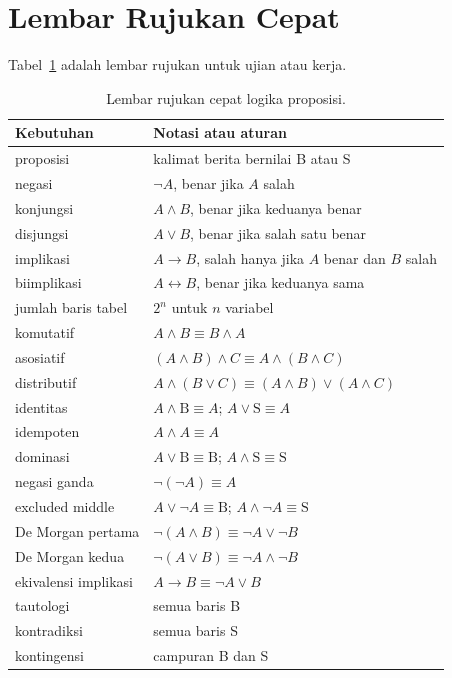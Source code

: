 \documentclass[11pt,a4paper]{article}
\begin{document}
\section{Lembar Rujukan Cepat}

Tabel~\ref{tab:rujukan-cepat} adalah lembar rujukan untuk ujian atau kerja.

\begin{table}[H]
	\centering
	\caption{Lembar rujukan cepat logika proposisi.}
	\label{tab:rujukan-cepat}
	\footnotesize
	\begin{tabularx}{\textwidth}{l X}
		\toprule
		Kebutuhan & Notasi atau aturan \\
		\midrule
		proposisi & kalimat berita bernilai B atau S \\
		negasi & $\neg A$, benar jika $A$ salah \\
		konjungsi & $A \wedge B$, benar jika keduanya benar \\
		disjungsi & $A \vee B$, benar jika salah satu benar \\
		implikasi & $A \to B$, salah hanya jika $A$ benar dan $B$ salah \\
		biimplikasi & $A \leftrightarrow B$, benar jika keduanya sama \\
		jumlah baris tabel & $2^n$ untuk $n$ variabel \\
		komutatif & $A \wedge B \equiv B \wedge A$ \\
		asosiatif & $(A \wedge B) \wedge C \equiv A \wedge (B \wedge C)$ \\
		distributif & $A \wedge (B \vee C) \equiv (A \wedge B) \vee (A \wedge C)$ \\
		identitas & $A \wedge \text{B} \equiv A$; $A \vee \text{S} \equiv A$ \\
		idempoten & $A \wedge A \equiv A$ \\
		dominasi & $A \vee \text{B} \equiv \text{B}$; $A \wedge \text{S} \equiv \text{S}$ \\
		negasi ganda & $\neg(\neg A) \equiv A$ \\
		excluded middle & $A \vee \neg A \equiv \text{B}$; $A \wedge \neg A \equiv \text{S}$ \\
		De Morgan pertama & $\neg(A \wedge B) \equiv \neg A \vee \neg B$ \\
		De Morgan kedua & $\neg(A \vee B) \equiv \neg A \wedge \neg B$ \\
		ekivalensi implikasi & $A \to B \equiv \neg A \vee B$ \\
		tautologi & semua baris B \\
		kontradiksi & semua baris S \\
		kontingensi & campuran B dan S \\
		\bottomrule
	\end{tabularx}
\end{table}
\end{document}
